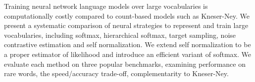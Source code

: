 Training neural network language models over large vocabularies is computationally costly compared to count-based models such as Kneser-Ney. We present a systematic comparison of neural strategies to represent and train large vocabularies, including softmax, hierarchical softmax, target sampling, noise contrastive estimation and self normalization. We extend self normalization to be a proper estimator of likelihood and introduce an efficient variant of softmax. We evaluate each method on three popular benchmarks, examining performance on rare words, the speed/accuracy trade-off, complementarity to Kneser-Ney.
